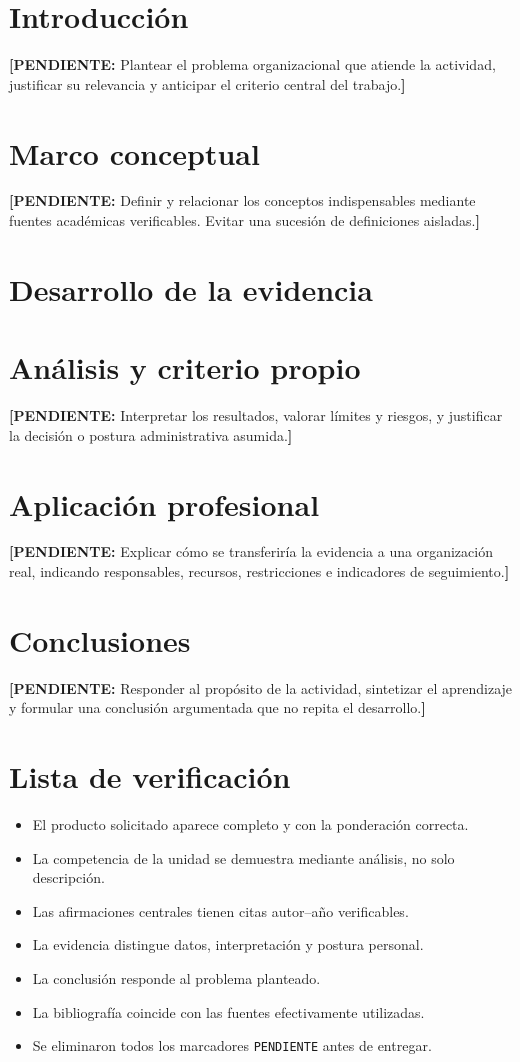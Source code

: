 \documentclass[12pt,letterpaper,oneside]{article}
\newcommand{\pendiente}[1]{\textcolor{itescaRedDark}{\textbf{[PENDIENTE:} #1\textbf{]}}}
\begin{document}
\section{Introducción}
\pendiente{Plantear el problema organizacional que atiende la actividad, justificar su relevancia y anticipar el criterio central del trabajo.}

\section{Marco conceptual}
\pendiente{Definir y relacionar los conceptos indispensables mediante fuentes académicas verificables. Evitar una sucesión de definiciones aisladas.}

\section{Desarrollo de la evidencia}
\actividadcontenido

\section{Análisis y criterio propio}
\pendiente{Interpretar los resultados, valorar límites y riesgos, y justificar la decisión o postura administrativa asumida.}

\section{Aplicación profesional}
\pendiente{Explicar cómo se transferiría la evidencia a una organización real, indicando responsables, recursos, restricciones e indicadores de seguimiento.}

\section{Conclusiones}
\pendiente{Responder al propósito de la actividad, sintetizar el aprendizaje y formular una conclusión argumentada que no repita el desarrollo.}

\section*{Lista de verificación}
\begin{itemize}[label=$\square$]
  \item El producto solicitado aparece completo y con la ponderación correcta.
  \item La competencia de la unidad se demuestra mediante análisis, no solo descripción.
  \item Las afirmaciones centrales tienen citas autor--año verificables.
  \item La evidencia distingue datos, interpretación y postura personal.
  \item La conclusión responde al problema planteado.
  \item La bibliografía coincide con las fuentes efectivamente utilizadas.
  \item Se eliminaron todos los marcadores \texttt{PENDIENTE} antes de entregar.
\end{itemize}

\clearpage
\nocite{itescaProgramaFundamentosGestion,robbinsCoulter2018Administracion}

\end{document}
